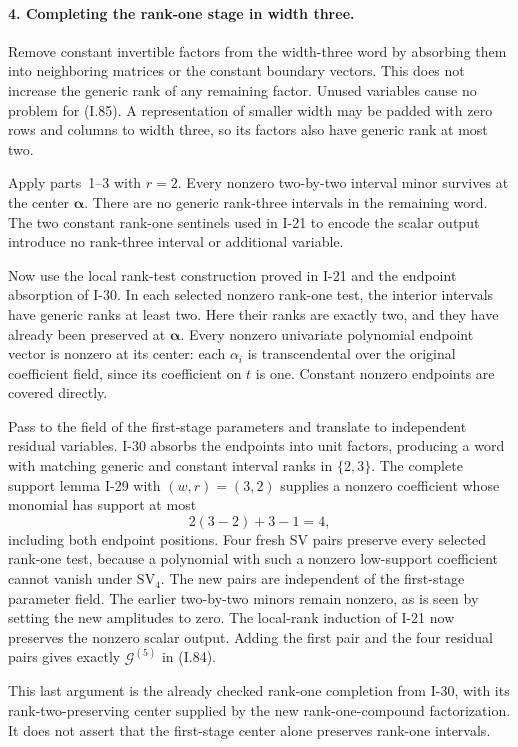 \paragraph{4. Completing the rank-one stage in width three.}
Remove constant invertible factors from the width-three word by
absorbing them into neighboring matrices or the constant boundary
vectors. This does not increase the generic rank of any remaining
factor. Unused variables cause no problem for (I.85). A representation
of smaller width may be padded with zero rows and columns to width
three, so its factors also have generic rank at most two.

Apply parts~1--3 with $r=2$. Every nonzero two-by-two interval
minor survives at the center $\boldsymbol\alpha$. There are no
generic rank-three intervals in the remaining word. The two
constant rank-one sentinels used in I-21 to encode the scalar
output introduce no rank-three interval or additional variable.

Now use the local rank-test construction proved in I-21 and
the endpoint absorption of I-30. In each selected nonzero
rank-one test, the interior intervals have generic ranks at
least two. Here their ranks are exactly two, and they have
already been preserved at $\boldsymbol\alpha$. Every nonzero
univariate polynomial endpoint vector is nonzero at its center:
each $\alpha_i$ is transcendental over the original coefficient
field, since its coefficient on $t$ is one. Constant nonzero
endpoints are covered directly.

Pass to the field of the first-stage parameters and translate
to independent residual variables. I-30 absorbs the endpoints
into unit factors, producing a word with matching generic and
constant interval ranks in $\{2,3\}$. The complete support
lemma I-29 with $(w,r)=(3,2)$ supplies a nonzero coefficient
whose monomial has support at most
\[
 2(3-2)+3-1=4,
 \tag{I.88}
\]
including both endpoint positions. Four fresh SV pairs preserve
every selected rank-one test, because a polynomial with such a
nonzero low-support coefficient cannot vanish under $\mathrm{SV}_4$.
The new pairs are independent of the first-stage parameter field.
The earlier two-by-two minors remain nonzero, as is seen by setting
the new amplitudes to zero. The local-rank induction of I-21 now
preserves the nonzero scalar output. Adding the first pair and
the four residual pairs gives exactly $\mathcal G^{(5)}$ in (I.84).

This last argument is the already checked rank-one completion
from I-30, with its rank-two-preserving center supplied by the
new rank-one-compound factorization. It does not assert that
the first-stage center alone preserves rank-one intervals.

